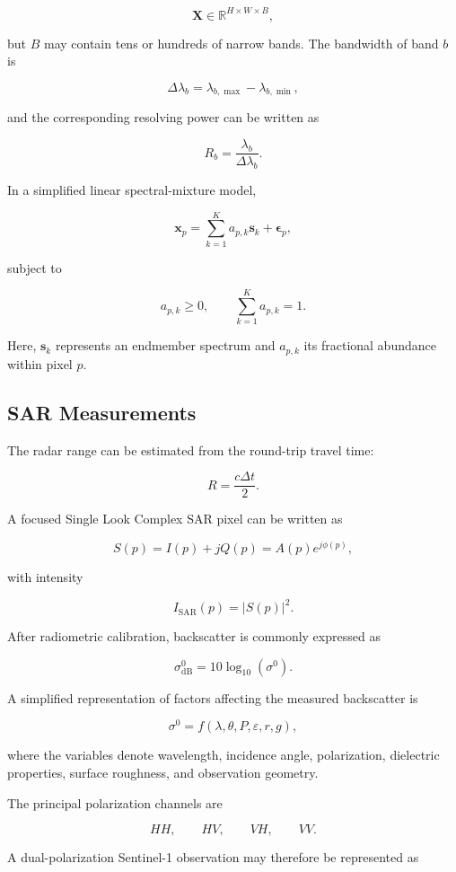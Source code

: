 \documentclass[
    11pt,
    a4paper,
    parskip=half,
    bibliography=totoc,
    numbers=noenddot
]{scrartcl}
\begin{document}
\[
\mathbf{X}\in\mathbb{R}^{H\times W\times B},
\]

but \(B\) may contain tens or hundreds of narrow bands. The bandwidth of
band \(b\) is

\[
\Delta\lambda_b =
\lambda_{b,\max}-\lambda_{b,\min},
\]

and the corresponding resolving power can be written as

\[
R_b=\frac{\lambda_b}{\Delta\lambda_b}.
\]

In a simplified linear spectral-mixture model,

\[
\mathbf{x}_p
=
\sum_{k=1}^{K}a_{p,k}\mathbf{s}_k
+
\boldsymbol{\epsilon}_p,
\]

subject to

\[
a_{p,k}\geq0,
\qquad
\sum_{k=1}^{K}a_{p,k}=1.
\]

Here, \(\mathbf{s}_k\) represents an endmember spectrum and \(a_{p,k}\)
its fractional abundance within pixel \(p\).

\subsection{SAR Measurements}

The radar range can be estimated from the round-trip travel time:

\[
R=\frac{c\Delta t}{2}.
\]

A focused Single Look Complex SAR pixel can be written as

\[
S(p)=I(p)+jQ(p)=A(p)e^{j\phi(p)},
\]

with intensity

\[
I_{\mathrm{SAR}}(p)=|S(p)|^2.
\]

After radiometric calibration, backscatter is commonly expressed as

\[
\sigma^0_{\mathrm{dB}}
=
10\log_{10}(\sigma^0).
\]

A simplified representation of factors affecting the measured
backscatter is

\[
\sigma^0 =
f(\lambda,\theta,P,\varepsilon,r,g),
\]

where the variables denote wavelength, incidence angle, polarization,
dielectric properties, surface roughness, and observation geometry.

The principal polarization channels are

\[
HH,\qquad HV,\qquad VH,\qquad VV.
\]

A dual-polarization Sentinel-1 observation may therefore be represented as
\end{document}
